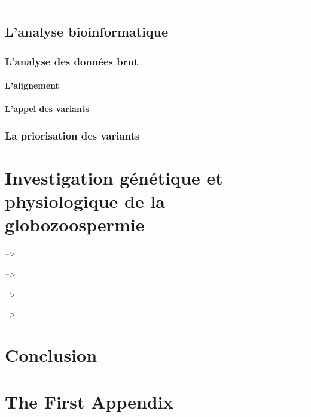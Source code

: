 \documentclass[12pt,twoside]{reedthesis}
\theoremstyle{definition}
\theoremstyle{definition}
\theoremstyle{remark}
\begin{document}
  \begin{center}\rule{0.5\linewidth}{\linethickness}\end{center}
  
  \section{L'analyse bioinformatique}\label{lanalyse-bioinformatique}
  
  \subsection{L'analyse des données brut}\label{lanalyse-des-donnees-brut}
  
  \subsubsection{L'alignement}\label{lalignement}
  
  \subsubsection{L'appel des variants}\label{lappel-des-variants}
  
  \subsection{La priorisation des
  variants}\label{la-priorisation-des-variants}
  
  \chapter{Investigation génétique et physiologique de la
  globozoospermie}\label{globo}
  
  --\textgreater{}
  
  --\textgreater{}
  
  --\textgreater{}
  
  --\textgreater{}
  
  \chapter*{Conclusion}\label{conclusion}
  
  \appendix
  
  \chapter{The First Appendix}\label{the-first-appendix}
  
\end{document}
